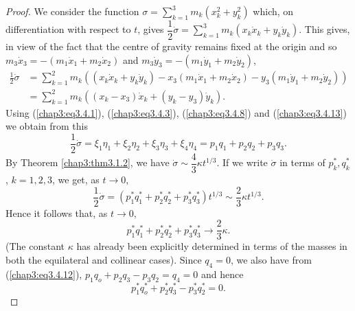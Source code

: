\begin{proof}
We consider the function $\sigma = \sum\limits^3_{k=1} m_k (x^2_k +
y^2_k)$ which, on differentiation with respect to $t$, gives
$\dfrac{1}{2} \dot{\sigma} = \sum\limits^3_{k=1} m_k( x_k \dot{x}_k +
y_k \dot{y}_k)$. This gives, in view of the fact that the centre of
gravity remains fixed at the origin and so $m_3 \dot{x}_3 = - (m_1
\dot{x}_1 + m_2 \dot{x}_2)$ and $m_3 \dot{y}_3 = - (m_1 \dot{y}_1 +
m_2 \dot{y}_2)$, 
\begin{align*}
\frac{1}{2} \dot{\sigma} & = \sum\limits^2_{k=1} m_k ((x_k \dot{x}_k +
y_k \dot{y}_k) - x_3 (m_1 \dot{x}_1 + m_2 \dot{x}_2 ) - y_3 (m_1
\dot{y}_1 + m_2 \dot{y}_2))\\ 
& = \sum\limits^2_{k=1} m_k ((x_k - x_3) \dot{x}_k + (y_k - y_3) \dot{y}_k).
\end{align*}
Using (\ref{chap3:eq3.4.1}), (\ref{chap3:eq3.4.3}),
(\ref{chap3:eq3.4.8}) and (\ref{chap3:eq3.4.13}) we obtain from this  
$$
\frac{1}{2} \dot{\sigma} = \xi_1 \eta_1 + \xi_2 \eta_2 + \xi_3 \eta_3
+ \xi_4 \eta_4 = p_1 q_1 + p_2 q_2 + p_3 q_3.   
$$
By Theorem \ref{chap3:thm3.1.2}, we have $\dot{\sigma} \sim
\dfrac{4}{3} \kappa t^{1/3}$. If we write $\dot{\sigma}$ in terms of
$p^*_k, q^*_k$, $k=1,2,3 $, we get, as $t \to 0$, 
$$
\frac{1}{2} \dot{\sigma} = (p^*_1 q^*_1  + p^*_2 q^*_2 + p^*_3 q^*_3)
t^{1/3} \sim\frac{2}{3} \kappa t^{1/3}.  
$$
Hence it follows that, as $t \to 0$,
\begin{equation*}
p^*_1 q^*_1 + p^*_2 q^*_2 + p^*_3 q^*_3 \to \frac{2}{3}
\kappa. \tag{3.4.20}\label{chap3:eq3.4.20} 
\end{equation*}
(The constant $\kappa$ has already been explicitly determined in terms
of the masses in both the equilateral and collinear cases). Since $q_4
= 0$, we also have from (\ref{chap3:eq3.4.12}), $p_1 q_o + p_2 q_3 -
p_3 q_2 = q_4 = 0$ and hence 
\begin{equation*}
p^*_1 q^*_o + p^*_2 q^*_3  - p^*_3 q^*_2 =
0. \tag{3.4.21}\label{chap3:eq3.4.21} 
\end{equation*}\pageoriginale


\end{proof}
